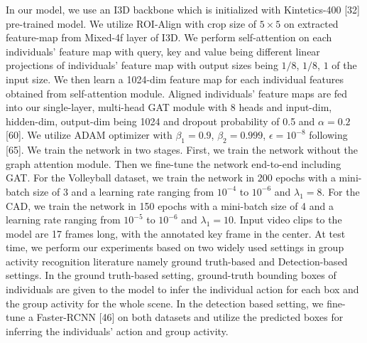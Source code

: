 \documentclass[10pt,journal,compsoc]{IEEEtran}
\begin{document}
In our model, we use an I3D backbone which is initialized with Kintetics-400 [32] pre-trained model. We utilize ROI-Align with crop size of $5\times5$ on extracted feature-map from Mixed-4f layer of I3D. We perform self-attention on each individuals' feature map with query, key and value being different linear projections of individuals' feature map with output sizes being $1/8$, $1/8$, $1$ of the input size. We then learn a 1024-dim feature map for each individual features obtained from self-attention module. Aligned individuals' feature maps are fed into our single-layer, multi-head GAT module with 8 heads and input-dim, hidden-dim, output-dim being 1024 and dropout probability of 0.5 and $\alpha = 0.2$ [60]. We utilize ADAM optimizer with $\beta_1 = 0.9$, $\beta_2 = 0.999$, $\epsilon = 10^{-8}$ following [65]. We train the network in two stages. First, we train the network without the graph attention module. Then we fine-tune the network end-to-end including GAT. For the Volleyball dataset, we train the network in 200 epochs with a mini-batch size of 3 and a learning rate ranging from $10^{-4}$ to $10^{-6}$ and $\lambda_1 = 8$. For the CAD, we train the network in 150 epochs with a mini-batch size of 4 and a learning rate ranging from $10^{-5}$ to $10^{-6}$ and $\lambda_1 = 10$. Input video clips to the model are 17 frames long, with the annotated key frame in the center. At test time, we perform our experiments based on two widely used settings in group activity recognition literature namely ground truth-based and Detection-based settings. In the ground truth-based setting, ground-truth bounding boxes of individuals are given to the model to infer the individual action for each box and the group activity for the whole scene. In the detection based setting, we fine-tune a Faster-RCNN [46] on both datasets and utilize the predicted boxes for inferring the individuals' action and group activity.



\end{document}

